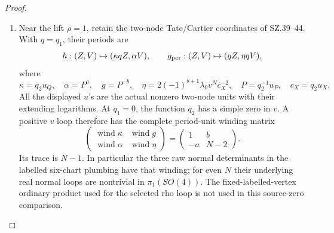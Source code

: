 \begin{proof}
\begin{enumerate}[label=\arabic*.]
\par\nobreak

\item Near the lift \(\rho=1\), retain the two-node Tate/Cartier
coordinates of SZ.39--44. With \(q=q_1\), their periods are
\[
 h:(Z,V)\mapsto(\kappa qZ,\alpha V),\qquad
 g_{\rm per}:(Z,V)\mapsto(gZ,\eta qV),
\]
where
\[
 \kappa=q_2u_Q,\quad \alpha=P^a,\quad
 g=P^{-b},\quad
 \eta=2(-1)^{b+1}\lambda_0v^Nc_X^{-2},\quad
 P=q_2^{-1}u_P,\quad c_X=q_2u_X.
                                                        \tag{RG.4a}
\]
All the displayed \(u\)'s are the actual nonzero two-node
units with their extending logarithms. At \(q_1=0\), the
function \(q_2\) has a simple zero in \(v\). A positive \(v\)
loop therefore has the complete period-unit winding matrix
\[
 \begin{pmatrix}
  \operatorname{wind}\kappa&\operatorname{wind}g\\
  \operatorname{wind}\alpha&\operatorname{wind}\eta
 \end{pmatrix}
 =
 \begin{pmatrix}1&b\\-a&N-2\end{pmatrix}.              \tag{RG.4b}
\]
Its trace is \(N-1\). In particular the three raw normal
determinants in the labelled six-chart plumbing have that
winding; for even \(N\) their underlying real normal loops
are nontrivial in \(\pi_1(SO(4))\). The fixed-labelled-vertex
ordinary product used for the selected rho loop is not used
in this source-zero comparison.


\end{enumerate}
\end{proof}
